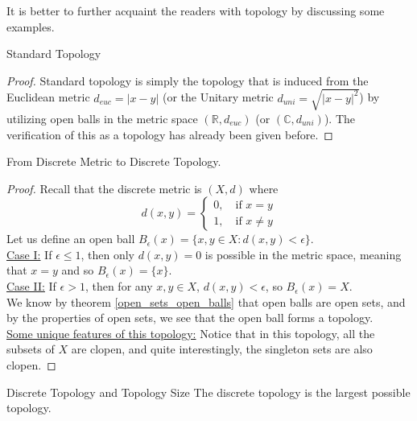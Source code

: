 \noindent It is better to further acquaint the readers with topology by discussing some examples.
\begin{Example}\label{standard_topology}
    Standard Topology
\end{Example}
\begin{proof}
    Standard topology is simply the topology that is induced from the Euclidean metric $d_{euc}=|x-y|$ (or the Unitary metric $d_{uni}=\sqrt{|x-y|^2}$) by utilizing open balls in the metric space $(\mathbb{R},d_{euc})$ (or $(\mathbb{C},d_{uni})$). The verification of this as a topology has already been given before.
\end{proof}
\begin{Example}\label{discrete_topology}
    From Discrete Metric to Discrete Topology.
\end{Example}
\begin{proof}
    Recall that the discrete metric is $(X,d)$ where
    $$d(x,y)=\begin{cases}
        0,\quad \text{if }x=y\\
        1,\quad \text{if }x\neq y
    \end{cases}$$
    Let us define an open ball $B_{\epsilon}(x)=\{x,y\in X:d(x,y)<\epsilon\}$.\\
    \underline{Case I:} If $\epsilon\leq1$, then only $d(x,y)=0$ is possible in the metric space, meaning that $x=y$ and so $B_{\epsilon}(x)=\{x\}$.\\
    \underline{Case II:} If $\epsilon>1$, then for any $x,y\in X$, $d(x,y)<\epsilon$, so $B_{\epsilon}(x)=X$.\\
    We know by theorem \eqref{open_sets_open_balls} that open balls are open sets, and by the properties of open sets, we see that the open ball forms a topology.\\
    \underline{Some unique features of this topology:} Notice that in this topology, all the subsets of $X$ are clopen, and quite interestingly, the singleton sets are also clopen.
\end{proof}
\begin{Theorem}{Discrete Topology and Topology Size}\label{discrete_topology_size}
    The discrete topology is the largest possible topology.
\end{Theorem}
